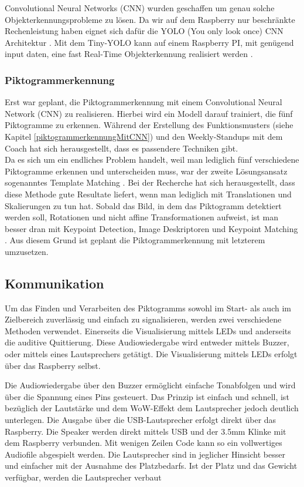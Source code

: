Convolutional Neural Networks (CNN) wurden geschaffen um genau solche Objekterkennungsprobleme zu lösen.
Da wir auf dem Raspberry nur beschränkte Rechenleistung haben eignet sich dafür die YOLO (You only look once) CNN 
Architektur \cite{YOLOv3}. Mit dem Tiny-YOLO kann auf einem Raspberry PI, mit genügend input daten, eine
fast Real-Time Objekterkennung realisiert werden \cite{YOLORaspi}.



\subsubsection{Piktogrammerkennung}
\label{piktogrammerkennung}
Erst war geplant, die Piktogrammerkennung mit einem Convolutional Neural Network (CNN) zu realisieren. Hierbei wird ein Modell darauf trainiert, die fünf Piktogramme zu erkennen. Während der Erstellung des Funktionsmusters (siehe Kapitel \ref{piktogrammerkennungMitCNN}) und den Weekly-Standups mit dem Coach hat sich herausgestellt, dass es passendere Techniken gibt.\\
Da es sich um ein endliches Problem handelt, weil man lediglich fünf verschiedene Piktogramme erkennen und unterscheiden muss, war der zweite Lösungsansatz sogenanntes Template Matching \cite{OpenCV-Template-Matching}. Bei der Recherche hat sich herausgestellt, dass diese Methode gute Resultate liefert, wenn man lediglich mit Translationen und Skalierungen zu tun hat. Sobald das Bild, in dem das Piktogramm detektiert werden soll, Rotationen und nicht affine Transformationen aufweist, ist man besser dran mit Keypoint Detection, Image Deskriptoren und Keypoint Matching \cite{OpenCV-Feature-Matching}. Aus diesem Grund ist geplant die Piktogrammerkennung mit letzterem umzusetzen.




\subsection {Kommunikation}
\label{kommunikation}
Um das Finden und Verarbeiten des Piktogramms sowohl im Start- als auch im Zielbereich zuverlässig und einfach zu signalisieren, werden zwei verschiedene Methoden verwendet. Einerseits die Visualisierung mittels LEDs und anderseits die auditive Quittierung. Diese Audiowiedergabe wird entweder mittels Buzzer, oder mittels eines Lautsprechers getätigt. Die Visualisierung mittels LEDs erfolgt über das Raspberry selbst.

Die Audiowiedergabe über den Buzzer ermöglicht einfache Tonabfolgen und wird über die Spannung eines Pins gesteuert. Das Prinzip ist einfach und schnell, ist bezüglich der Lautstärke und dem \glqq WoW-Effekt \grqq{} dem Lautsprecher jedoch deutlich unterlegen.
Die Ausgabe über die USB-Lautsprecher erfolgt direkt über das Raspberry. Die Speaker werden direkt mittels USB und der 3.5mm Klinke mit dem Raspberry verbunden. Mit wenigen Zeilen Code kann so ein vollwertiges Audiofile abgespielt werden.
Die Lautsprecher sind in jeglicher Hinsicht besser und einfacher mit der Ausnahme des Platzbedarfs. Ist der Platz und das Gewicht verfügbar, werden die Lautsprecher verbaut 

